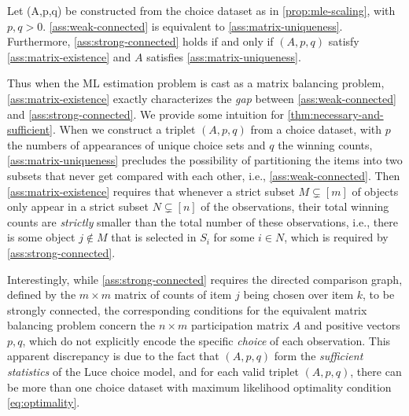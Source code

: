 \begin{theorem}
\label{thm:necessary-and-sufficient}
Let (A,p,q) be constructed from the choice dataset as in \cref{prop:mle-scaling}, with $p,q>0$. \cref{ass:weak-connected} is equivalent to \cref{ass:matrix-uniqueness}. Furthermore, \cref{ass:strong-connected} holds if and only if $(A,p,q)$ satisfy \cref{ass:matrix-existence} and $A$ satisfies \cref{ass:matrix-uniqueness}.
\end{theorem} 
Thus when the ML estimation problem is cast as a matrix balancing problem, \cref{ass:matrix-existence} exactly characterizes the \emph{gap} between \cref{ass:weak-connected} and \cref{ass:strong-connected}. 
 We provide some intuition for \cref{thm:necessary-and-sufficient}. When we construct a triplet $(A,p,q)$ from a choice dataset, with $p$ the numbers of appearances of unique choice sets and $q$ the winning counts, \cref{ass:matrix-uniqueness} precludes the possibility of partitioning the items into two subsets that never get compared with each other, i.e., \cref{ass:weak-connected}. Then \cref{ass:matrix-existence} requires that whenever a strict subset $M\subsetneq [m]$ of objects only appear in a strict subset $N\subsetneq [n]$ of the observations, their total winning counts are \emph{strictly} smaller than the total number of these observations, i.e., there is some object $j\notin M$ that is selected in $S_i$ for some $i\in N$, which is required by \cref{ass:strong-connected}.

Interestingly, while \cref{ass:strong-connected} requires the directed comparison graph, defined by the $m\times m$ matrix of counts of item $j$ being chosen over item $k$, to be strongly connected, the corresponding conditions for the equivalent matrix balancing problem concern the $n\times m$ participation matrix $A$ and positive vectors $p,q$, which do not explicitly encode the specific \emph{choice} of each observation. This apparent discrepancy is due to the fact that $(A,p,q)$ form the \emph{sufficient statistics} of the Luce choice model, and for each valid triplet $(A,p,q)$, there can be more than one choice dataset with maximum likelihood optimality condition \eqref{eq:optimality}.

